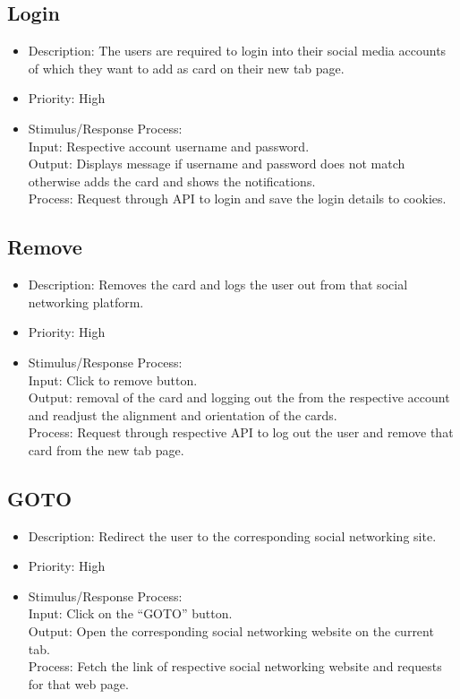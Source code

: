 \documentclass[12pt]{article}
\begin{document}
\subsection{Login}
\begin{itemize}
    \item  Description: The users are required to login into their social media
accounts of which they want to add as card on their new tab
page.

    \item Priority: High
    \item Stimulus/Response Process:\\
Input: Respective account username and password.\\
    Output: Displays message if username and
password does not match otherwise adds
the card and shows the notifications.\\

Process: Request through API to login and save the login details to cookies.

 
\end{itemize}

\subsection{Remove}
\begin{itemize}
    \item Description: Removes the card and logs the user out from that
social networking platform.
    \item Priority: High
    \item 
Stimulus/Response Process:\\
Input: Click to remove button.\\
Output: removal of the card and logging out the from the
respective account and readjust the alignment and
orientation of the cards.\\
Process: Request through respective API to log out the
user and remove that card from the new tab page.
\end{itemize}

\subsection{GOTO}
\begin{itemize}
    \item Description: Redirect the user to the corresponding social
networking site.
 
    \item  Priority: High

    \item 
Stimulus/Response Process:\\

Input: Click on the “GOTO” button.\\
Output: Open the corresponding social networking
website on the current tab.\\
Process: Fetch the link of respective social networking
website and requests for that web page. 
\end{itemize}
\end{document}
